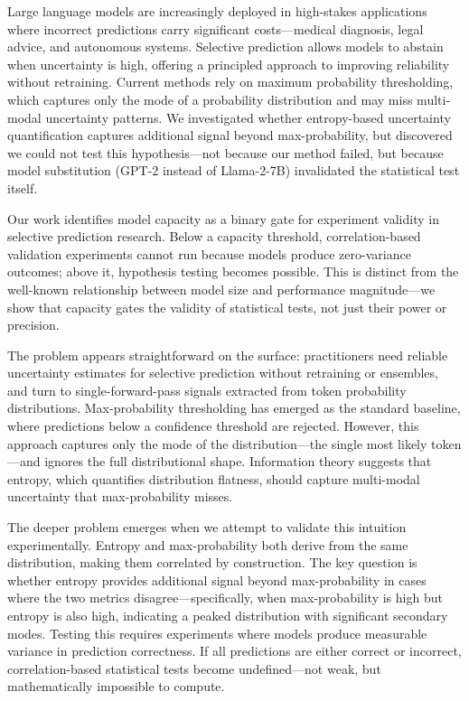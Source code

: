 
Large language models are increasingly deployed in high-stakes applications where incorrect predictions carry significant costs---medical diagnosis, legal advice, and autonomous systems. Selective prediction allows models to abstain when uncertainty is high, offering a principled approach to improving reliability without retraining. Current methods rely on maximum probability thresholding, which captures only the mode of a probability distribution and may miss multi-modal uncertainty patterns. We investigated whether entropy-based uncertainty quantification captures additional signal beyond max-probability, but discovered we could not test this hypothesis---not because our method failed, but because model substitution (GPT-2 instead of Llama-2-7B) invalidated the statistical test itself.

Our work identifies model capacity as a binary gate for experiment validity in selective prediction research. Below a capacity threshold, correlation-based validation experiments cannot run because models produce zero-variance outcomes; above it, hypothesis testing becomes possible. This is distinct from the well-known relationship between model size and performance magnitude---we show that capacity gates the validity of statistical tests, not just their power or precision.

The problem appears straightforward on the surface: practitioners need reliable uncertainty estimates for selective prediction without retraining or ensembles, and turn to single-forward-pass signals extracted from token probability distributions. Max-probability thresholding has emerged as the standard baseline, where predictions below a confidence threshold are rejected. However, this approach captures only the mode of the distribution---the single most likely token---and ignores the full distributional shape. Information theory suggests that entropy, which quantifies distribution flatness, should capture multi-modal uncertainty that max-probability misses.

The deeper problem emerges when we attempt to validate this intuition experimentally. Entropy and max-probability both derive from the same distribution, making them correlated by construction. The key question is whether entropy provides additional signal beyond max-probability in cases where the two metrics disagree---specifically, when max-probability is high but entropy is also high, indicating a peaked distribution with significant secondary modes. Testing this requires experiments where models produce measurable variance in prediction correctness. If all predictions are either correct or incorrect, correlation-based statistical tests become undefined---not weak, but mathematically impossible to compute.

